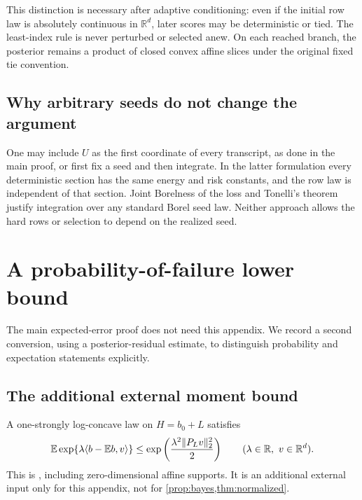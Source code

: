 \documentclass[11pt]{article}
\numberwithin{equation}{section}
\theoremstyle{definition}
\theoremstyle{remark}
\newcommand{\R}{\mathbb R}
\newcommand{\E}{\mathbb E}
\DeclarePairedDelimiter{\norm}{\lVert}{\rVert}
\newcommand{\ip}[2]{\langle #1,#2\rangle}
\begin{document}
This distinction is necessary after adaptive conditioning: even if the initial row law is absolutely continuous in $\R^d$, later scores may be deterministic or tied. The least-index rule is never perturbed or selected anew. On each reached branch, the posterior remains a product of closed convex affine slices under the original fixed tie convention.

\subsection{Why arbitrary seeds do not change the argument}

One may include $U$ as the first coordinate of every transcript, as done in the main proof, or first fix a seed and then integrate. In the latter formulation every deterministic section has the same energy and risk constants, and the row law is independent of that section. Joint Borelness of the loss and Tonelli's theorem justify integration over any standard Borel seed law. Neither approach allows the hard rows or selection to depend on the realized seed.

\section{A probability-of-failure lower bound}\label{app:residual}

The main expected-error proof does not need this appendix. We record a second conversion, using a posterior-residual estimate, to distinguish probability and expectation statements explicitly.

\subsection{The additional external moment bound}

A one-strongly log-concave law on $H=b_0+L$ satisfies
\begin{equation}\label{eq:external-subgaussian}
\E\exp\{\lambda\ip{b-\E b}{v}\}
\le\exp\left(\frac{\lambda^2\norm{P_Lv}_2^2}{2}\right)
\qquad(\lambda\in\R,\ v\in\R^d).
\end{equation}
This is \cite[Lemma~37]{ZZQL2026}, including zero-dimensional affine supports. It is an additional external input only for this appendix, not for \cref{prop:bayes,thm:normalized}.
\end{document}
